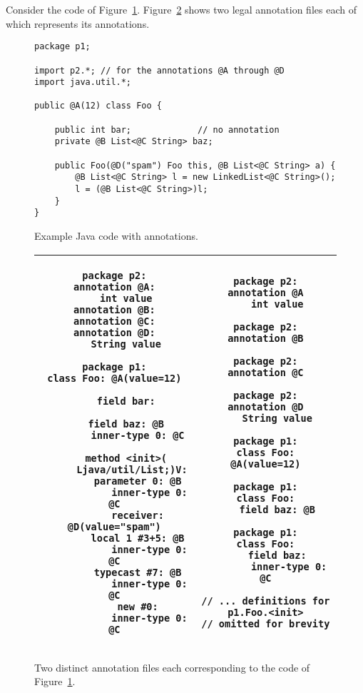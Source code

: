 \documentclass{article}
\begin{document}
Consider the code of Figure~\ref{fig:java-example}.
Figure~\ref{fig:annotation-file-examples} shows two legal annotation files
each of which represents its annotations.


\begin{figure}
\begin{verbatim}
package p1;

import p2.*; // for the annotations @A through @D
import java.util.*;

public @A(12) class Foo {

    public int bar;             // no annotation
    private @B List<@C String> baz;

    public Foo(@D("spam") Foo this, @B List<@C String> a) {
        @B List<@C String> l = new LinkedList<@C String>();
        l = (@B List<@C String>)l;
    }
}
\end{verbatim}
\caption{Example Java code with annotations.}
\label{fig:java-example}
\end{figure}


\begin{figure}
\begin{tabular}{|c|c|}
\hline
\begin{minipage}[t]{.5\textwidth}
\begin{verbatim}
package p2:
annotation @A:
    int value
annotation @B:
annotation @C:
annotation @D:
    String value

package p1:
class Foo: @A(value=12)

    field bar:

    field baz: @B
        inner-type 0: @C

    method <init>(
      Ljava/util/List;)V:
        parameter 0: @B
            inner-type 0: @C
        receiver: @D(value="spam")
        local 1 #3+5: @B
            inner-type 0: @C
        typecast #7: @B
            inner-type 0: @C
        new #0:
            inner-type 0: @C
\end{verbatim}
\end{minipage}
&
\begin{minipage}[t]{.45\textwidth}
\begin{verbatim}
package p2:
annotation @A
    int value

package p2:
annotation @B

package p2:
annotation @C

package p2:
annotation @D
    String value

package p1:
class Foo: @A(value=12)

package p1:
class Foo:
    field baz: @B

package p1:
class Foo:
    field baz:
        inner-type 0: @C

// ... definitions for p1.Foo.<init>
// omitted for brevity
\end{verbatim}
\end{minipage}
\\
\hline
\end{tabular}

\caption{Two distinct annotation files each corresponding to the code of
  Figure~\ref{fig:java-example}.}
\label{fig:annotation-file-examples}
\end{figure}
\end{document}
